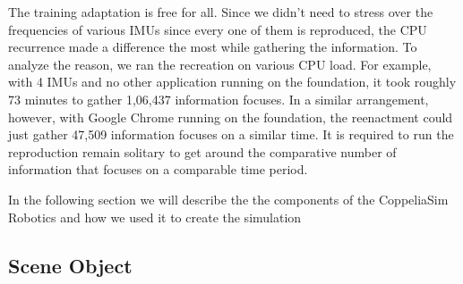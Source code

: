 The training adaptation is free for all. Since we didn't need to stress over the frequencies of various IMUs since every one of them is reproduced, the CPU recurrence made a difference the most while gathering the information. To analyze the reason, we ran the recreation on various CPU load. For example, with 4 IMUs and no other application running on the foundation, it took roughly 73 minutes to gather 1,06,437 information focuses. In a similar arrangement, however, with Google Chrome running on the foundation, the reenactment could just gather 47,509 information focuses on a similar time. It is required to run the reproduction remain solitary to get around the comparative number of information that focuses on a comparable time period.

In the following section we will describe the the components of the CoppeliaSim Robotics and how we used it to create the simulation 

\subsection{Scene Object}


